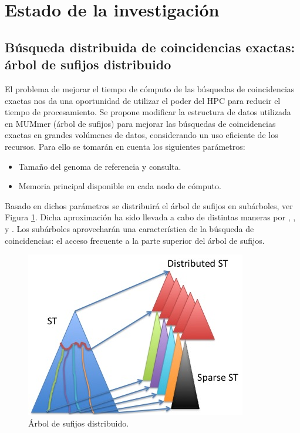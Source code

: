 \documentclass[12pt,a4paper]{article}
\begin{document}
\section{Estado de la investigación}
\subsection{Búsqueda distribuida de coincidencias exactas: árbol de sufijos distribuido}
El problema de mejorar el tiempo de cómputo de las búsquedas de coincidencias 
exactas nos da una oportunidad de utilizar el poder del HPC para reducir el
tiempo de procesamiento. Se propone modificar la estructura de datos utilizada en 
MUMmer (árbol de sufijos) para mejorar las búsquedas de coincidencias exactas en 
grandes volúmenes de datos, considerando un uso eficiente de los recursos. Para 
ello se tomarán en cuenta los siguientes parámetros: 
\begin{itemize}
\item Tamaño del genoma de referencia y consulta.
\item Memoria principal disponible en cada nodo de cómputo.
\end{itemize}
Basado en dichos parámetros se distribuirá el árbol de sufijos en subárboles, 
ver Figura \ref{fig:estructura}. Dicha aproximación ha sido llevada a cabo de distintas maneras por \cite{Mansour2012}, 
\cite{Japp2004}, \cite{Ghoting2010} y \cite{Sadakane}.
 Los subárboles aprovecharán una característica
de la búsqueda de coincidencias: el acceso frecuente a la parte superior del 
árbol de sufijos.\\ 
\begin{figure}[h]
\begin{center}
\includegraphics[scale=0.8]{distributed.png}
\caption{Árbol de sufijos distribuido.}
\label{fig:estructura}
\end{center}
\end{figure}
\end{document}
